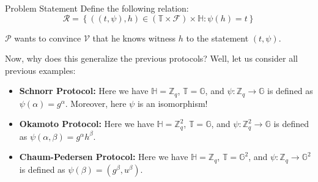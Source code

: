 \documentclass{zkdl-presentation-template}
\begin{document}
    \begin{frame}{Problem Statement}
        Define the following relation:
        \begin{equation*}
            \mathcal{R} = \left\{ ((t,\psi), h) \in (\mathbb{T} \times \mathcal{F}) \times \mathbb{H}: \psi(h) = t \right\}
        \end{equation*}
        \pause

        $\mathcal{P}$ wants to convince $\mathcal{V}$ that he knows witness $h$ to the statement $(t,\psi)$.\pause
        \begin{proposition}
            \small
            Now, why does this generalize the previous protocols? Well, let us consider all previous examples:
            \begin{itemize}
                \item \textbf{Schnorr Protocol:} Here we have $\mathbb{H} = \mathbb{Z}_q$, $\mathbb{T} = \mathbb{G}$, and $\psi: \mathbb{Z}_q \to \mathbb{G}$ is defined as $\psi(\alpha) = g^{\alpha}$. Moreover, here $\psi$ is an isomorphism!\pause
                \item \textbf{Okamoto Protocol:} Here we have $\mathbb{H} = \mathbb{Z}_q^2$, $\mathbb{T} = \mathbb{G}$, and $\psi: \mathbb{Z}_q^2 \to \mathbb{G}$ is defined as $\psi(\alpha,\beta) = g^{\alpha}h^{\beta}$.\pause
                \item \textbf{Chaum-Pedersen Protocol:} Here we have $\mathbb{H} = \mathbb{Z}_q$, $\mathbb{T} = \mathbb{G}^2$, and $\psi: \mathbb{Z}_q \to \mathbb{G}^2$ is defined as $\psi(\beta) = (g^{\beta},u^{\beta})$.
            \end{itemize}
        \end{proposition}
    \end{frame}
\end{document}
